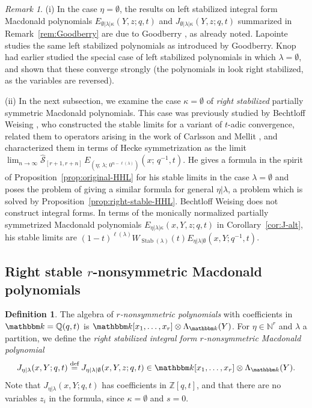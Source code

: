 \documentclass[12pt]{amsart}
\theoremstyle{definition}
\newtheorem{defn}[thm]{Definition}
\theoremstyle{remark}
\newtheorem{remark}[thm]{Remark}
\newcommand{\NN}{{\mathbb N}}
\newcommand{\QQ}{{\mathbb Q}}
\newcommand{\ZZ}{{\mathbb Z}}
\newcommand{\kk}{{\mathbbm k}}
\newcommand{\Scal}{{\mathcal S}}
\DeclareMathOperator{\Stab}{Stab}
\newcommand{\hsym}{\widehat{\Scal}}    %
\newcommand{\defeq}{\mathrel{\overset{\text{{\rm def}}}{=}}}
\newcommand{\Jns}{J}           %
\begin{document}
\begin{remark}\label{rem:previous-stable-Macs}
(i) In the case $\eta =\emptyset $, the results on left stabilized
integral form Macdonald polynomials $E_{\emptyset |\lambda |\kappa
}(Y,z; q,t)$ and $\Jns _{\emptyset |\lambda |\kappa }(Y,z; q,t)$
summarized in Remark~\ref{rem:Goodberry} are due to Goodberry
\cite{Goodberry22, Goodberry24}, as already noted.  Lapointe
\cite{Lapointe22} studies the same left stabilized polynomials as
introduced by Goodberry.  Knop \cite{Knop07} had earlier studied the
special case of left stabilized polynomials in which
$\lambda = \emptyset $,
and shown that these converge strongly (the
polynomials in \cite{Knop07} look right stabilized, as the variables
are reversed).

(ii) In the next subsection, we examine the case $\kappa =\emptyset $
of {\em right stabilized} partially symmetric Macdonald polynomials.
This case was previously studied by Bechtloff Weising
\cite{BechtloffWeising23}, who constructed the stable limits for a
variant of $t$-adic convergence, related them to operators arising
in the work of Carlsson and Mellit \cite{CarlMell18}, and
characterized them in terms of
Hecke symmetrization as the
 limit $\lim_{n\rightarrow \infty } \hsym
_{[r+1,r+n]}\, E_{(\eta;\, \lambda ;\, 0^{n-\ell (\lambda)})}(x;\,
q^{-1},t)$.
He gives a
formula in the spirit of Proposition~\ref{prop:original-HHL} for his
stable limits in the case $\lambda =\emptyset $ and poses the problem
of giving a similar formula for general $\eta |\lambda$, a problem
which is solved by Proposition~\ref{prop:right-stable-HHL}.
Bechtloff Weising does not construct integral forms.  In terms of the
monically normalized partially symmetrized Macdonald polynomials
$E_{\eta|\lambda |\kappa }(x,Y,z; q,t)$ in Corollary~\ref{cor:J-alt}, his
stable limits are $(1-t)^{\ell (\lambda )}W_{\Stab (\lambda )}(t)
E_{\eta|\lambda |\emptyset }(x,Y;q^{-1},t)$.
\end{remark}


\subsection{Right stable \texorpdfstring{$r$}{r}-nonsymmetric
Macdonald polynomials} \label{ss:right stable unmod}

\begin{defn}\label{def:right-stable}
The algebra of {\em $r$-nonsymmetric polynomials} with coefficients in
$\kk =\QQ (q,t)$ is $\kk [x_{1},\ldots,x_{r}]\otimes \Lambda _{\kk
}(Y)$.  For $\eta \in \NN ^{r}$ and $\lambda $ a partition, we define
the {\em right stabilized integral form $r$-nonsymmetric Macdonald
polynomial}
\begin{equation}\label{e:right-stable}
\Jns _{\eta |\lambda }(x,Y;q,t) \defeq \Jns _{\eta |\lambda |\emptyset
}(x,Y,z;q,t) \in \kk [x_{1},\ldots,x_{r}]\otimes \Lambda _{\kk }(Y).
\end{equation}
Note that $\Jns _{\eta |\lambda }(x,Y;q,t)$ has coefficients in $\ZZ
[q,t]$, and that there are no variables $z_{i}$ in the formula, since
$\kappa = \emptyset$ and $s=0$.
\end{defn}
\end{document}
